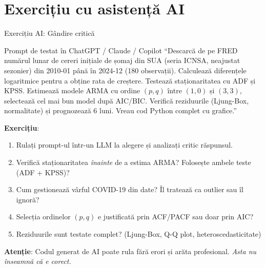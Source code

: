 \documentclass[9pt, aspectratio=169, t]{beamer}
\begin{document}
\section{Exercițiu cu asistență AI}

\begin{frame}{Exercițiu AI: Gândire critică}
    \vspace{-3mm}
    \begin{block}{\footnotesize Prompt de testat în ChatGPT / Claude / Copilot}
        {\footnotesize
        ``Descarcă de pe FRED numărul lunar de cereri inițiale de șomaj din SUA (seria ICNSA, neajustat sezonier) din 2010-01 până în 2024-12 (180 observații). Calculează diferențele logaritmice pentru a obține rata de creștere. Testează staționaritatea cu ADF și KPSS. Estimează modele ARMA cu ordine $(p,q)$ între $(1,0)$ și $(3,3)$, selectează cel mai bun model după AIC/BIC. Verifică reziduurile (Ljung-Box, normalitate) și prognozează 6 luni. Vreau cod Python complet cu grafice.''
        }
    \end{block}
    \vspace{-2mm}
    {\footnotesize
    \textbf{Exercițiu}:
    \begin{enumerate}\setlength{\itemsep}{0pt}
        \item Rulați prompt-ul într-un LLM la alegere și analizați critic răspunsul.
        \item Verifică staționaritatea \textit{înainte} de a estima ARMA? Folosește ambele teste (ADF + KPSS)?
        \item Cum gestionează vârful COVID-19 din date? Îl tratează ca outlier sau îl ignoră?
        \item Selecția ordinelor $(p,q)$ e justificată prin ACF/PACF sau doar prin AIC?
        \item Reziduurile sunt testate complet? (Ljung-Box, Q-Q plot, heteroscedasticitate)
    \end{enumerate}
    }
    \vspace{-2mm}
    \begin{alertblock}{}
        {\footnotesize \textbf{Atenție}: Codul generat de AI poate rula fără erori și arăta profesional. \textit{Asta nu înseamnă că e corect.}}
    \end{alertblock}
\end{frame}
\end{document}
